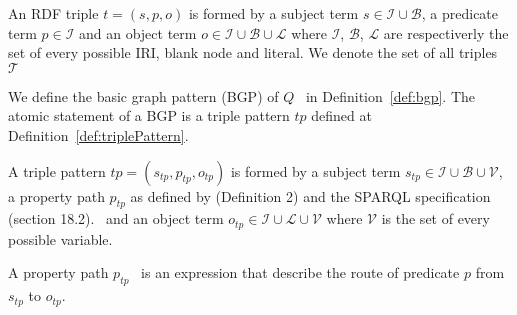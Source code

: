 \begin{definition}\label{def:triple}
    An RDF triple $t = (s,p,o)$ is formed by a subject term $s \in \mathcal{I} \cup \mathcal{B}$, a predicate term  $p \in \mathcal{I}$ and an object term $o \in \mathcal{I} \cup \mathcal{B} \cup \mathcal{L}$
    where $\mathcal{I}$, $\mathcal{B}$, $\mathcal{L}$ are respectiverly the set of every possible IRI, blank node and literal.
    We denote the set of all triples $\mathcal{T}$
\end{definition}

\iffalse
We define the basic graph pattern (BGP) of $Q$~ in Definition~\ref{def:bgp}.
The atomic statement of a BGP is a triple pattern $tp$ defined at Definition~\ref{def:triplePattern}.

\begin{definition}\label{def:triplePattern}
    A triple pattern $tp = (s_{tp},p_{tp},o_{tp})$ is formed by a subject term $s_{tp} \in \mathcal{I} \cup \mathcal{B} \cup \mathcal{V}$, 
    a property path  $p_{tp}$ as defined by  \citeauthor{Kostylev2015} (Definition 2) and the SPARQL specification (section 18.2).~ 
    and an object term  $o_{tp} \in \mathcal{I} \cup \mathcal{L} \cup \mathcal{V}$ 
    where $\mathcal{V}$ is the set of every possible variable. 
\end{definition}

\begin{definition}\label{def:propertyPath}
   A property path $p_{tp}$~\cite{Kostylev2015} is an expression that describe the route of predicate $p$ from $s_{tp}$ to $o_{tp}$.
   \iffalse
   A property path in $tp$ is defined as follow:
   \begin{equation}
    p_{tp} ::= p \in \mathcal{I} | (p_{tpi}/p_{tpj}) | (p_{tpi}|p_{tpj}) | p_{tpi}* | p_{tpi}+ | p_{tpi}? | !p_{tpi}| p_{tpi}^{-}
   \end{equation}.
   The "$/$" operator chain two property path, the alternative operator "$|$" define a possibility between $p_{tpi}$ and $p_{tpj}$.
   The "$^-$" operator inverse the path from $s_{tp}$ to $o_{tp}$.
   The "$!$" represent the negation of a path $p_{tpi}$ such as $p_{tpi} = \mathcal{I} \setminus p_{tpi}$.
   The "$*$", "$+$" and "$?$", refered to in this paper as \emph{cardinality property paths}, are respectively; the repetition of 0 and more of $p_{tpi}$, 
   the repetition of 1 and more of $p_{tpi}$ and the presence or absence of $p_{tpi}$.
   \fi
\end{definition}

